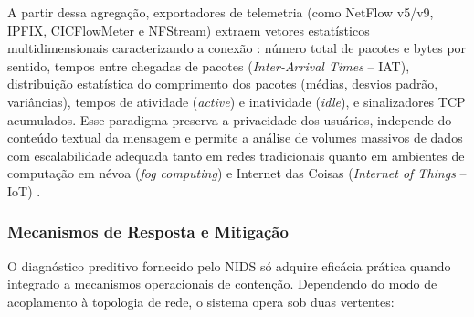\begin{itemize}
    A partir dessa agregação, exportadores de telemetria (como NetFlow v5/v9, IPFIX, CICFlowMeter e NFStream) extraem vetores estatísticos multidimensionais caracterizando a conexão \cite{standard2021}: número total de pacotes e bytes por sentido, tempos entre chegadas de pacotes (\emph{Inter-Arrival Times} -- IAT), distribuição estatística do comprimento dos pacotes (médias, desvios padrão, variâncias), tempos de atividade (\emph{active}) e inatividade (\emph{idle}), e sinalizadores TCP acumulados. Esse paradigma preserva a privacidade dos usuários, independe do conteúdo textual da mensagem e permite a análise de volumes massivos de dados com escalabilidade adequada tanto em redes tradicionais quanto em ambientes de computação em névoa (\emph{fog computing}) e Internet das Coisas (\emph{Internet of Things} -- IoT) \cite{ciciot2023, emuiot2025, fogids2024}.
\end{itemize}

\subsubsection{Mecanismos de Resposta e Mitigação}

O diagnóstico preditivo fornecido pelo NIDS só adquire eficácia prática quando integrado a mecanismos operacionais de contenção. Dependendo do modo de acoplamento à topologia de rede, o sistema opera sob duas vertentes:


